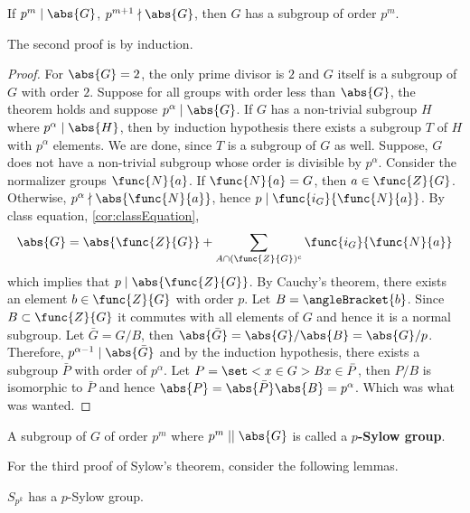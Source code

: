 \begin{corollary}
    If \(p^m \mid \abs{G}\), \(p^{m+1} \nmid \abs{G}\), then \(G\) has a subgroup of order \(p^m\).
\end{corollary}

The second proof is by induction. 
\begin{proof}
    For \(\abs{G} = 2\), the only prime divisor is \(2\) and \(G\) itself is a subgroup of \(G\) with order \(2\). Suppose for all groups with order less than \(\abs{G}\), the theorem holds and suppose \(p^{\alpha} \mid \abs{G}\). If \(G\) has a non-trivial subgroup \(H\) where \(p^{\alpha} \mid \abs{H}\), then by induction hypothesis there exists a subgroup \(T\) of \(H\) with \(p^{\alpha}\) elements. We are done, since \(T\) is a subgroup of \(G\) as well. Suppose, \(G\) does not have a non-trivial subgroup whose order is divisible by \(p^{\alpha}\). Consider the normalizer groups \(\func{N}{a}\). If \(\func{N}{a} = G\), then \(a \in \func{Z}{G}\). Otherwise, \(p^{\alpha}  \nmid \abs{\func{N}{a}}\), hence \(p \mid \func{i_G}{\func{N}{a}}\). By class equation, \ref{cor:classEquation},
    \begin{equation*}
        \abs{G} = \abs{\func{Z}{G}} + \sum_{A \cap (\func{Z}{G})^c}  \func{i_G}{\func{N}{a}}
    \end{equation*}
    which implies that \(p \mid \abs{\func{Z}{G}}\). By Cauchy's theorem, there exists an element \(b \in \func{Z}{G}\) with order \(p\). Let \(B = \angleBracket{b}\). Since \(B \subset \func{Z}{G}\) it commutes with all elements of \(G\) and hence it is a normal subgroup. Let \(\bar{G} = G/B\), then \(\abs{\bar{G}} = \abs{G}/\abs{B} = \abs{G}/p\). Therefore, \(p^{\alpha - 1} \mid \abs{\bar{G}}\) and by the induction hypothesis, there exists a subgroup \(\bar{P}\) with order of \(p^{\alpha}\). Let \(P = \set<x \in G>{Bx \in \bar{P}}\), then \(P/B\) is isomorphic to \(\bar{P}\) and hence \(\abs{P} = \abs{\bar{P}} \abs{B} = p^{\alpha}\). Which was what was wanted.
\end{proof}

A subgroup of \(G\) of order \(p^m\) where \(p^m \mid\mid \abs{G}\) is called a \textbf{\(p\)-Sylow group}.

For the third proof of Sylow's theorem, consider the following lemmas.

\begin{lemma}
    \(S_{p^k}\) has a \(p\)-Sylow group.
\end{lemma}

